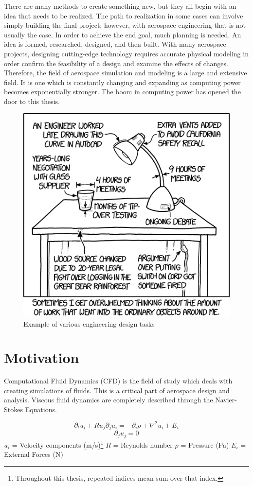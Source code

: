 

There are many methods to create something new, but they all begin with an idea that needs to be realized. The path to realization in some cases can involve simply building the final project; however, with aerospace engineering that is not usually the case. In order to achieve the end goal, much planning is needed. An idea is formed, researched, designed, and then built. With many aerospace projects, designing cutting-edge technology requires accurate physical modeling in order confirm the feasibility of a design and examine the effects of changes. Therefore, the field of aerospace simulation and modeling is a large and extensive field. It is one which is constantly changing and expanding as computing power becomes exponentially stronger. The boom in computing power has opened the door to this thesis. \par

\begin{figure}[ht]
    \includegraphics[width=.45\textwidth]{figures/work.png}
    \centering
    \caption[Example of various engineering design tasks]{Example of various engineering design tasks \cite{xkcd}}
    \label{fig:xkcd}
\end{figure}


\section{Motivation}





\indent Computational Fluid Dynamics (CFD) is the field of study which deals with creating simulations of fluids. This is a critical part of aerospace design and analysis. Viscous fluid dynamics are completely described through the Navier-Stokes Equations.

\begin{equation}
    \label{eqn:navier_1}
    \partial_t u_i + R u_j \partial_j u_i = -\partial_i \rho + \nabla^2 u_i + E_i 
\end{equation}
\begin{equation}
    \label{eqn:navier_2}
        \partial_j u_j = 0  
\end{equation}
\(u_i\) = Velocity components (m/s)\footnote{Throughout this thesis, repeated indices mean sum over that index.} \newline
\(R\) = Reynolds number \newline
\(\rho\) = Pressure (Pa) \newline
\(E_i\) = External Forces (N) \par



